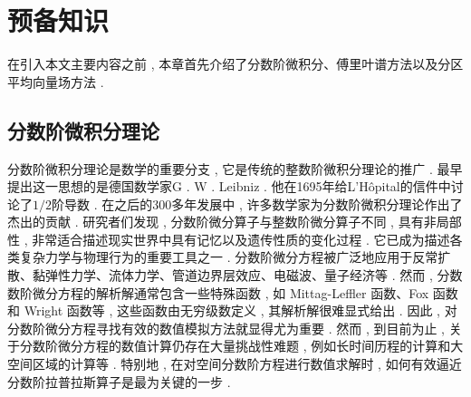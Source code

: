 \chapter[预备知识]{预备知识}

在引入本文主要内容之前 , 本章首先介绍了分数阶微积分、傅里叶谱方法以及分区平均向量场方法 . 
\section{分数阶微积分理论}
分数阶微积分理论是数学的重要分支 , 它是传统的整数阶微积分理论的推广 . 最早提出这一思想的是德国数学家G . W . Leibniz . 他在1695年给L'Hôpital的信件中讨论了$1/2$阶导数 . 在之后的300多年发展中 , 许多数学家为分数阶微积分理论作出了杰出的贡献\cite{SunZhiZhongFenShuJieWeiFenFangChengDeYouXianChaiFenFangFa2021} . 
研究者们发现 , 分数阶微分算子与整数阶微分算子不同 , 具有非局部性 , 非常适合描述现实世界中具有记忆以及遗传性质的变化过程 . 它已成为描述各类复杂力学与物理行为的重要工具之一 . 
分数阶微分方程被广泛地应用于反常扩散、黏弹性力学、流体力学、管道边界层效应、电磁波、量子经济等 . 
然而 , 分数数阶微分方程的解析解通常包含一些特殊函数 , 如 Mittag-Leffler 函数、Fox 函数和 Wright 函数等 , 这些函数由无穷级数定义 , 其解析解很难显式给出 . 
因此 , 对分数阶微分方程寻找有效的数值模拟方法就显得尤为重要 . 然而 , 到目前为止 , 关于分数阶微分方程的数值计算仍存在大量挑战性难题 , 例如长时间历程的计算和大空间区域的计算等 . 
特别地 , 在对空间分数阶方程进行数值求解时 , 如何有效逼近分数阶拉普拉斯算子是最为关键的一步 . 
